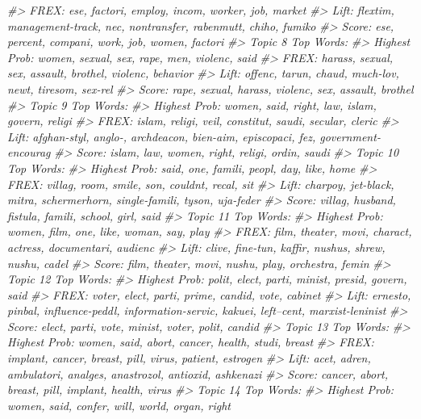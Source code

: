 \documentclass[
]{book}
\newenvironment{Shaded}{\begin{snugshade}}{\end{snugshade}}
\newcommand{\CommentTok}[1]{\textcolor[rgb]{0.56,0.35,0.01}{\textit{#1}}}
\begin{document}
\begin{Shaded}
\begin{Highlighting}[]
\CommentTok{#>       FREX: ese, factori, employ, incom, worker, job, market }
\CommentTok{#>       Lift: flextim, management-track, nec, nontransfer, rabenmutt, chiho, fumiko }
\CommentTok{#>       Score: ese, percent, compani, work, job, women, factori }
\CommentTok{#> Topic 8 Top Words:}
\CommentTok{#>       Highest Prob: women, sexual, sex, rape, men, violenc, said }
\CommentTok{#>       FREX: harass, sexual, sex, assault, brothel, violenc, behavior }
\CommentTok{#>       Lift: offenc, tarun, chaud, much-lov, newt, tiresom, sex-rel }
\CommentTok{#>       Score: rape, sexual, harass, violenc, sex, assault, brothel }
\CommentTok{#> Topic 9 Top Words:}
\CommentTok{#>       Highest Prob: women, said, right, law, islam, govern, religi }
\CommentTok{#>       FREX: islam, religi, veil, constitut, saudi, secular, cleric }
\CommentTok{#>       Lift: afghan-styl, anglo-, archdeacon, bien-aim, episcopaci, fez, government-encourag }
\CommentTok{#>       Score: islam, law, women, right, religi, ordin, saudi }
\CommentTok{#> Topic 10 Top Words:}
\CommentTok{#>       Highest Prob: said, one, famili, peopl, day, like, home }
\CommentTok{#>       FREX: villag, room, smile, son, couldnt, recal, sit }
\CommentTok{#>       Lift: charpoy, jet-black, mitra, schermerhorn, single-famili, tyson, uja-feder }
\CommentTok{#>       Score: villag, husband, fistula, famili, school, girl, said }
\CommentTok{#> Topic 11 Top Words:}
\CommentTok{#>       Highest Prob: women, film, one, like, woman, say, play }
\CommentTok{#>       FREX: film, theater, movi, charact, actress, documentari, audienc }
\CommentTok{#>       Lift: clive, fine-tun, kaffir, nushus, shrew, nushu, cadel }
\CommentTok{#>       Score: film, theater, movi, nushu, play, orchestra, femin }
\CommentTok{#> Topic 12 Top Words:}
\CommentTok{#>       Highest Prob: polit, elect, parti, minist, presid, govern, said }
\CommentTok{#>       FREX: voter, elect, parti, prime, candid, vote, cabinet }
\CommentTok{#>       Lift: ernesto, pinbal, influence-peddl, information-servic, kakuei, left--cent, marxist-leninist }
\CommentTok{#>       Score: elect, parti, vote, minist, voter, polit, candid }
\CommentTok{#> Topic 13 Top Words:}
\CommentTok{#>       Highest Prob: women, said, abort, cancer, health, studi, breast }
\CommentTok{#>       FREX: implant, cancer, breast, pill, virus, patient, estrogen }
\CommentTok{#>       Lift: acet, adren, ambulatori, analges, anastrozol, antioxid, ashkenazi }
\CommentTok{#>       Score: cancer, abort, breast, pill, implant, health, virus }
\CommentTok{#> Topic 14 Top Words:}
\CommentTok{#>       Highest Prob: women, said, confer, will, world, organ, right }

\end{Highlighting}
\end{Shaded}
\end{document}
